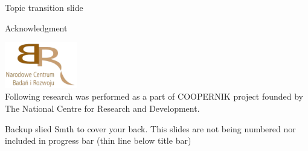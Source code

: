 \documentclass{beamer}
\begin{document}
\begin{frame}[standout]
    Topic transition slide
\end{frame}


\begin{frame}{Acknowledgment}
\begin{center}
\includegraphics[height=2cm]{logos/ncbir.png} \\
Following research was performed as a part of COOPERNIK project founded by The National Centre for Research and Development.
\end{center}
\end{frame}



\appendix

\begin{frame}{Backup slied}
    Smth to cover your back. This slides are not being numbered nor included in progress bar (thin line below title bar)
\end{frame}
\end{document}
